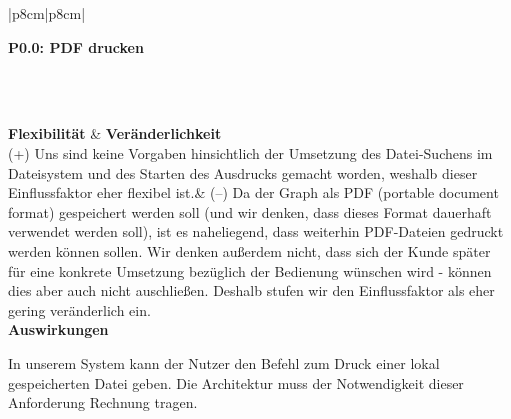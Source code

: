 \documentclass[enabledeprecatedfontcommands,fontsize=11pt,paper=a4,twoside]{scrartcl}
\newcounter{one}
\newcounter{two}[one]
\newcommand{\tone}{0\theone}
\newcommand{\two}{\stepcounter{two}0\thetwo}
\begin{document}
\begin{tabular} {|p{8cm}|p{8cm}|}
	\hline
	 {\parbox{16cm}{\textbf{\hypertarget{ll}{P\tone.\two}: PDF drucken}} } \\  \hline\hline 
	\rule{0pt}{4ex}\\ [2ex] \hline
	\textbf{Flexibilität}  & \textbf{Veränderlichkeit} \\
	(+) Uns sind keine Vorgaben hinsichtlich der Umsetzung des Datei-Suchens im Dateisystem und des Starten des Ausdrucks gemacht worden, weshalb dieser Einflussfaktor eher flexibel ist.& 
	(–) Da der Graph als PDF (portable document format) gespeichert werden soll (und wir denken, dass dieses Format dauerhaft verwendet werden soll), ist es naheliegend, dass weiterhin PDF-Dateien gedruckt werden können sollen. Wir denken außerdem nicht, dass sich der Kunde später für eine konkrete Umsetzung bezüglich der Bedienung wünschen wird - können dies aber auch nicht auschließen. Deshalb stufen wir den Einflussfaktor als eher gering veränderlich ein.\\
	\hline
	 {\textbf{Auswirkungen}} \\
	 {\parbox{16cm}{In unserem System kann der Nutzer den Befehl zum Druck einer lokal gespeicherten Datei geben. Die Architektur muss der Notwendigkeit dieser Anforderung Rechnung tragen.} }\\ \hline
\end{tabular}
\\ \\ \\ \\%
\end{document}
